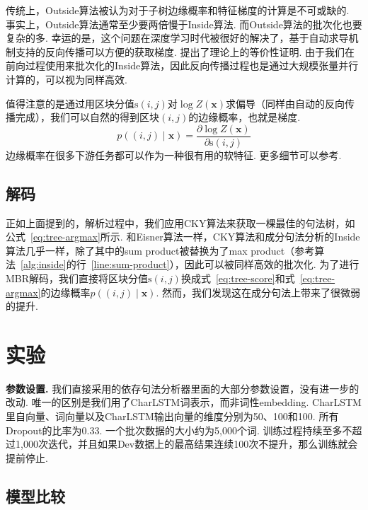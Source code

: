 传统上，Outside算法被认为对于子树边缘概率和特征梯度的计算是不可或缺的.
事实上，Outside算法通常至少要两倍慢于Inside算法.
而Outside算法的批次化也要复杂的多.
幸运的是，这个问题在深度学习时代被很好的解决了，基于自动求导机制支持的反向传播可以方便的获取梯度.
\citet{eisner-2016-inside}提出了理论上的等价性证明.
由于我们在前向过程使用来批次化的Inside算法，因此反向传播过程也是通过大规模张量并行计算的，可以视为同样高效.

值得注意的是通过用区块分值$\mathrm{s}(i,j)$对$\log Z(\boldsymbol{x})$求偏导（同样由自动的反向传播完成），我们可以自然的得到区块$(i,j)$的边缘概率，也就是梯度.
\begin{equation} \label{eq:con-partial-derivative}
	p((i, j)\mid\boldsymbol{x}) = \frac{\partial \log Z(\boldsymbol{x})}{\partial \mathrm{s}(i, j)}
\end{equation}
边缘概率在很多下游任务都可以作为一种很有用的软特征.
更多细节可以参考\citet{eisner-2016-inside}.

\subsection{解码}

正如上面提到的，解析过程中，我们应用CKY算法来获取一棵最佳的句法树，如公式~\ref{eq:tree-argmax}所示.
和Eisner算法一样，CKY算法和成分句法分析的Inside算法几乎一样，除了其中的sum product被替换为了max product（参考算法~\ref{alg:inside}的行~\ref{line:sum-product}），因此可以被同样高效的批次化.
为了进行MBR解码，我们直接将区块分值$\mathrm{s}(i,j)$换成式~\ref{eq:tree-score}和式~\ref{eq:tree-argmax}的边缘概率$p((i,j)\mid\boldsymbol{x})$.
然而，我们发现这在成分句法上带来了很微弱的提升.

\section{实验}
\label{sec:con-experiments}

\noindent\textbf{参数设置.}
我们直接采用\citet{dozat-etal-2017-biaffine}的依存句法分析器里面的大部分参数设置，没有进一步的改动.
唯一的区别是我们用了CharLSTM词表示，而非词性embedding.
CharLSTM里自向量、词向量以及CharLSTM输出向量的维度分别为50、100和100.
所有Dropout的比率为0.33.
一个批次数据的大小约为5,000个词.
训练过程持续至多不超过1,000次迭代，并且如果Dev数据上的最高结果连续100次不提升，那么训练就会提前停止.



\subsection{模型比较}

